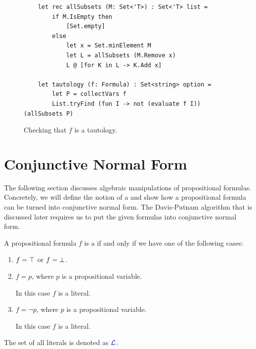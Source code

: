 \begin{figure}[!ht]
  \centering
\begin{verbatim}
    let rec allSubsets (M: Set<'T>) : Set<'T> list =
        if M.IsEmpty then
            [Set.empty]
        else
            let x = Set.minElement M
            let L = allSubsets (M.Remove x)
            L @ [for K in L -> K.Add x]

    let tautology (f: Formula) : Set<string> option =
        let P = collectVars f
        List.tryFind (fun I -> not (evaluate f I)) (allSubsets P)
\end{verbatim}
\vspace*{-0.3cm}
  \caption{Checking that $f$ is a tautology.}
  \label{fig:tautology.py}
\end{figure}



\section{Conjunctive Normal Form}
The following section discusses algebraic manipulations of propositional formulas.  Concretely, we will define
the notion of a  and show how a propositional formula can be turned into
conjunctive normal form.  The Davis-Putnam algorithm that is discussed later requires us to put the given
formulas into conjunctive normal form.

\begin{Definition}[Literal]
  A propositional formula $f$ is a  if and only if we have one of the following cases: 
  \begin{enumerate}
  \item $f = \top$ or $f = \bot$.
  \item $f = p$, where $p$ is a propositional variable.

        In this case $f$ is a  literal.
  \item $f = \neg p$, where $p$ is a propositional variable. 

        In this case $f$ is a  literal.
  \end{enumerate}
  The set of all literals is denoted as  ${\color{blue}\mathcal{L}}$.  \eox
\end{Definition}


